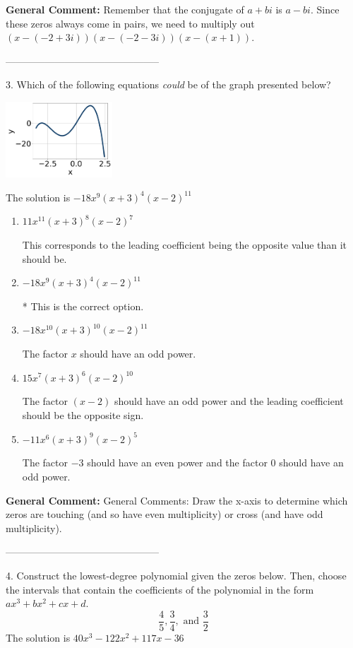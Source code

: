 \documentclass{extbook}[14pt]
\begin{document}
\textbf{General Comment:} Remember that the conjugate of $a+bi$ is $a-bi$. Since these zeros always come in pairs, we need to multiply out $(x-(-2 + 3 i))(x-(-2 - 3 i))(x-(x + 1))$. 

-----------------------------------------------

3. Which of the following equations \textit{could} be of the graph presented below?
\begin{center} \includegraphics[width=0.3\textwidth]{../Figures/polyGraphToFunctionA.png} \end{center} 

The solution is $ -18x^{9} (x + 3)^{4} (x - 2)^{11} $ 

\begin{enumerate}[label=\Alph*.] 
\item $ 11x^{11} (x + 3)^{8} (x - 2)^{7} $ 

 This corresponds to the leading coefficient being the opposite value than it should be. 
\item $ -18x^{9} (x + 3)^{4} (x - 2)^{11} $ 

 * This is the correct option. 
\item $ -18x^{10} (x + 3)^{10} (x - 2)^{11} $ 

 The factor $x$ should have an odd power. 
\item $ 15x^{7} (x + 3)^{6} (x - 2)^{10} $ 

 The factor $(x - 2)$ should have an odd power and the leading coefficient should be the opposite sign. 
\item $ -11x^{6} (x + 3)^{9} (x - 2)^{5} $ 

 The factor $-3$ should have an even power and the factor $0$ should have an odd power. 
\end{enumerate} 
 
\textbf{General Comment:} General Comments: Draw the x-axis to determine which zeros are touching (and so have even multiplicity) or cross (and have odd multiplicity). 

-----------------------------------------------

4. Construct the lowest-degree polynomial given the zeros below. Then, choose the intervals that contain the coefficients of the polynomial in the form $ax^3+bx^2+cx+d$.
\[ \frac{4}{5}, \frac{3}{4}, \text{ and } \frac{3}{2} \] 
The solution is $ 40x^{3} -122 x^{2} +117 x -36 $ 
\end{document}
